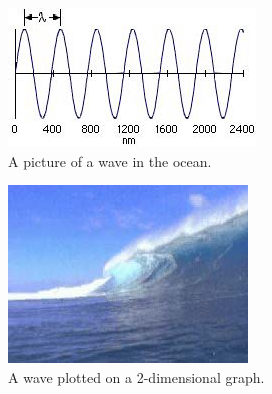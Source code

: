 \documentclass[
	chapter=7,
	title={Quantum Theory {\&} the Electronic Structure of Atoms},
	showanswers=true,
]{chem122notes}
\begin{document}
\begin{minipage}[m]{0.45\textwidth}
	\begin{figure}[H]
		\centering
		\includegraphics[width=\textwidth]{chapter7/image1}
		\caption{A picture of a wave in the ocean.}
		\label{fig:ocean-wave}
	\end{figure}
\end{minipage}\hfill%
\begin{minipage}[m]{0.45\textwidth}
	\begin{figure}[H]
		\centering
		\includegraphics[width=\textwidth]{chapter7/image2}
		\caption{A wave plotted on a 2-dimensional graph.}
		\label{fig:plotted-wave}
	\end{figure}

\end{minipage}
\end{document}
